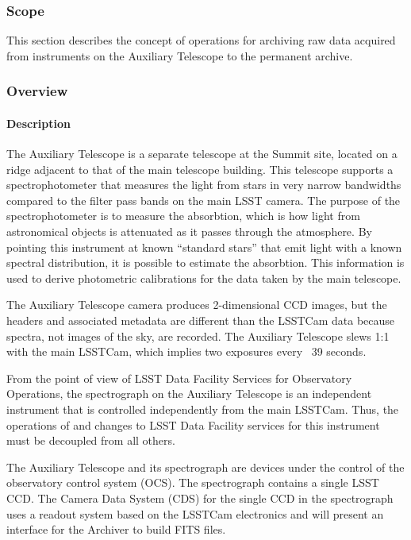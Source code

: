 \subsubsection{Scope}

This section describes the concept of operations for archiving raw data acquired
from instruments on the Auxiliary Telescope to the permanent archive.

\subsubsection{Overview}

\paragraph{Description}

The Auxiliary Telescope is a separate telescope at the Summit site, located on a
ridge adjacent to that of the main telescope building. This telescope supports a
spectrophotometer that measures the light from stars in very narrow bandwidths
compared to the filter pass bands on the main LSST camera. The purpose of the
spectrophotometer is to measure the absorbtion, which is how light from astronomical
objects is attenuated as it passes through the atmosphere. By pointing this instrument
at known “standard stars” that emit light with a known spectral distribution, it is
possible to estimate the absorbtion. This information is used to derive photometric
calibrations for the data taken by the main telescope.

The Auxiliary Telescope camera produces 2-dimensional CCD images, but the headers
and associated metadata are different than the LSSTCam data because spectra, not
images of the sky, are recorded. The Auxiliary Telescope slews 1:1 with the main LSSTCam,
which implies two exposures every ~39 seconds.

From the point of view of LSST Data Facility Services for Observatory Operations, the
spectrograph on the Auxiliary Telescope is an independent instrument that is controlled
independently from the main LSSTCam. Thus, the operations of and changes to LSST
Data Facility services for this instrument must be decoupled from all others.

The Auxiliary Telescope and its spectrograph are devices under the
control of the observatory control system (OCS). The spectrograph
contains a single LSST CCD. The Camera Data System (CDS) for the single CCD in the
spectrograph uses a readout system based on the LSSTCam electronics and will
present an interface for the Archiver to build FITS files.

